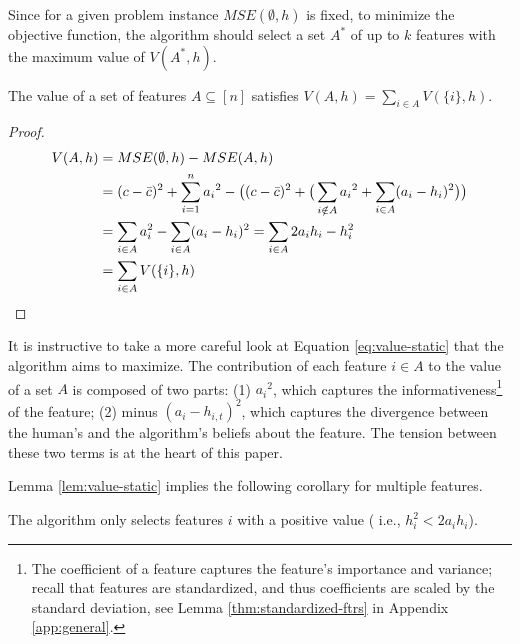 Since for a given problem instance $MSE(\emptyset, h)$ is fixed, to minimize the objective function, the algorithm should select a set $A^*$ of up to $k$ features with the maximum value of $V(A^*,h)$.


\begin{lemma} \label{lem:value-static}
The value of a set of features $A\subseteq[n]$ satisfies $V(A,h) = \sum_{i\in A} V(\{i\},h)$.
\end{lemma}
\begin{proof}
\begin{align}
 V(A,h) &= MSE(\emptyset,h) - MSE(A,h)  \notag \\
 &=
(c-\bar c)^2 + \sum_{i=1}^n {a_i}^2  - \big((c-\bar c)^2 + \big(\sum_{i \notin A} {a_i}^2 + \sum_{i \in A} (a_i - h_{i})^2 \big)\big) \notag  \\
&=\sum_{i\in A} a_i^2
- \sum_{i \in A} (a_i - h_i)^2 = \sum_{i\in A} 2a_i h_i-h_i^2  \label{eq:value-static} \\
&= \sum_{i \in A}  
V(\{i\}, h)  \notag
\end{align}
\end{proof}


It is instructive to take a more careful look at 
Equation \eqref{eq:value-static} that the algorithm aims to maximize. 
The contribution of each feature $i \in A$ to the value of a set $A$ is composed of two parts: 
(1) ${a_i}^2$, which captures the informativeness\footnote{The coefficient of a feature captures the feature's importance and variance; recall that features are standardized, and thus coefficients are scaled by the standard deviation, see Lemma \ref{thm:standardized-ftrs} in Appendix \ref{app:general}.} of the feature; (2) minus $(a_i - h_{i,t})^2$, which captures the divergence between the human's and the algorithm's beliefs about the feature. The tension between these two terms is at the heart of this paper. 


Lemma \ref{lem:value-static} implies the following corollary for multiple  features. 
\begin{corollary}
    The algorithm only selects features $i$ with a positive value ( i.e., $h_i^2 < 2 a_i h_i$).  
\end{corollary}

